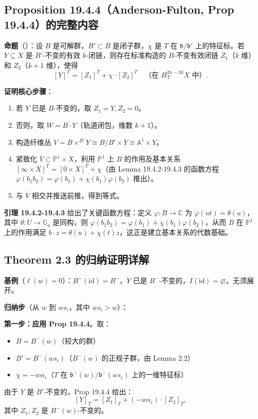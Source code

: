 \subsection{Proposition 19.4.4（Anderson-Fulton, Prop 19.4.4）的完整内容}
\textbf{命题}（\cite[Prop. 19.4.4]{anderson2023}）：设 $B$ 是可解群，$B' \subset B$ 是闭子群，$\chi$ 是 $T$ 在 $\mathfrak{b}/\mathfrak{b}'$ 上的特征标。若 $Y \subseteq X$ 是 $B'$-不变的有效 $k$-闭链，则存在标准构造的 $B$-不变有效闭链 $Z_1$（$k$ 维）和 $Z_2$（$k+1$ 维），使得
$$[Y]^T = [Z_1]^T + \chi \cdot [Z_2]^T \quad \text{（在 } H_T^{2n-2k}X\text{ 中）}.$$

\textbf{证明核心步骤}：
\begin{enumerate}
\item 若 $Y$ 已是 $B$-不变的，取 $Z_1 = Y, Z_2 = 0$。
\item 否则，取 $W = \overline{B \cdot Y}$（轨道闭包，维数 $k+1$）。
\item 构造纤维丛 $V = B \times^{B'} Y \cong B/B' \times Y \cong \mathbb{A}^1 \times Y$。
\item 紧致化 $\overline{V} \subset \mathbb{P}^1 \times X$，利用 $\mathbb{P}^1$ 上 $B$ 的作用及基本关系 $[\infty \times X]^T = [0 \times X]^T + \chi$（由 Lemma 19.4.2-19.4.3 的函数方程 $\varphi(b_1b_2) = \varphi(b_1) + \chi(b_1)\varphi(b_2)$ 推出）。
\item 与 $\overline{V}$ 相交并推送前推，得到等式。
\end{enumerate}

\textbf{引理 19.4.2-19.4.3} 给出了关键函数方程：定义 $\varphi: B \to \mathbb{C}$ 为 $\varphi(ut) = \theta(u)$，其中 $\theta: U \to \mathbb{G}_a$ 是同构，则 $\varphi(b_1b_2) = \varphi(b_1) + \chi(b_1)\varphi(b_2)$，从而 $B$ 在 $\mathbb{P}^1$ 上的作用满足 $b \cdot z = \theta(u) + \chi(t)z$，这正是建立基本关系的代数基础。

\subsection{Theorem 2.3 的归纳证明详解}
\textbf{基例}（$\ell(w) = 0$）：$B^-(\mathrm{id}) = B^-$，$Y$ 已是 $B^-$-不变的，$I(\mathrm{id}) = \varnothing$，无须展开。

\textbf{归纳步}（从 $w$ 到 $ws_i$，其中 $ws_i > w$）：

\textbf{第一步：应用 Prop 19.4.4}。取：
\begin{itemize}
\item $B = B^-(w)$（较大的群）
\item $B' = B^-(ws_i)$（$B^-(w)$ 的正规子群，由 Lemma 2.2）
\item $\chi = -w\alpha_i$（$T$ 在 $\mathfrak{b}^-(w)/\mathfrak{b}^-(ws_i)$ 上的一维特征标）
\end{itemize}
由于 $Y$ 是 $B'$-不变的，Prop 19.4.4 给出：
$$[Y]_T = [Z_1]_T + (-w\alpha_i) \cdot [Z_2]_T,$$
其中 $Z_1, Z_2$ 是 $B^-(w)$-不变的。

